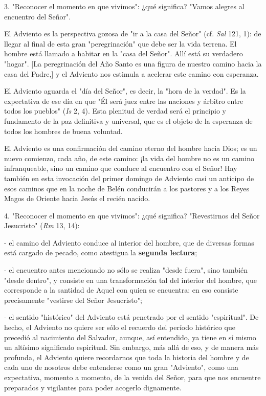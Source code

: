 3. "Reconocer el momento en que vivimos": ¿qué significa? "Vamos alegres
al encuentro del Señor".

El Adviento es la perspectiva gozosa de "ir a la casa del Señor" (cf.
\emph{Sal} 121, 1): de llegar al final de esta gran "peregrinación" que
debe ser la vida terrena. El hombre está llamado a habitar en la "casa
del Señor". Allí está su verdadero "hogar". {[}La peregrinación del Año
Santo es una figura de nuestro camino hacia la casa del Padre,{]} y el
Adviento nos estimula a acelerar este camino con esperanza.

El Adviento aguarda el "día del Señor", es decir, la "hora de la
verdad". Es la expectativa de ese día en que "Él será juez entre las
naciones y árbitro entre todos los pueblos" (\emph{Is} 2, 4). Esta
plenitud de verdad será el principio y fundamento de la paz definitiva y
universal, que es el objeto de la esperanza de todos los hombres de
buena voluntad.

El Adviento es una confirmación del camino eterno del hombre hacia Dios;
es un nuevo comienzo, cada año, de este camino: ¡la vida del hombre no
es un camino infranqueable, sino un camino que conduce al encuentro con
el Señor! Hay también en esta invocación del primer domingo de Adviento
casi un anticipo de esos caminos que en la noche de Belén conducirán a
los pastores y a los Reyes Magos de Oriente hacia Jesús el recién
nacido.

4. "Reconocer el momento en que vivimos": ¿qué significa? "Revestirnos
del Señor Jesucristo" (\emph{Rm} 13, 14):

- el camino del Adviento conduce al interior del hombre, que de diversas
formas está cargado de pecado, como atestigua la \textbf{segunda
	lectura};

- el encuentro antes mencionado no sólo se realiza "desde fuera", sino
también "desde dentro", y consiste en una transformación tal del
interior del hombre, que corresponde a la santidad de Aquel con quien se
encuentra: en eso consiste precisamente "vestirse del Señor Jesucristo";

- el sentido "histórico" del Adviento está penetrado por el sentido
"espiritual". De hecho, el Adviento no quiere ser sólo el recuerdo del
período histórico que precedió al nacimiento del Salvador, aunque, así
entendido, ya tiene en sí mismo un altísimo significado espiritual. Sin
embargo, más allá de eso, y de manera más profunda, el Adviento quiere
recordarnos que toda la historia del hombre y de cada uno de nosotros
debe entenderse como un gran "Adviento", como una expectativa, momento a
momento, de la venida del Señor, para que nos encuentre preparados y
vigilantes para poder acogerlo dignamente.

